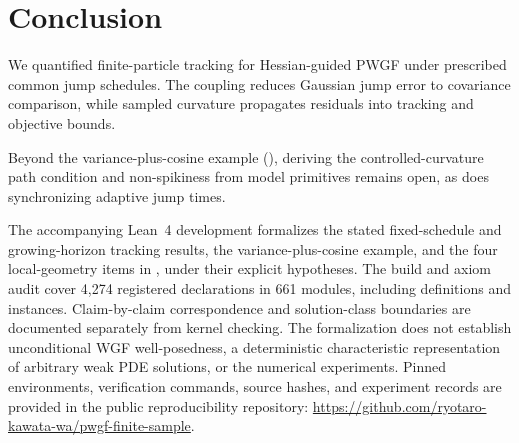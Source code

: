 \section{Conclusion}
\label{sec:conclusion}

We quantified finite-particle tracking for Hessian-guided PWGF under prescribed
common jump schedules. The coupling reduces Gaussian jump error to covariance
comparison, while sampled curvature propagates residuals into tracking and
objective bounds.

Beyond the variance-plus-cosine example
(), deriving the controlled-curvature
path condition and non-spikiness from model primitives remains open,
as does synchronizing adaptive jump times.

The accompanying Lean~4 development formalizes the stated fixed-schedule
and growing-horizon tracking results, the variance-plus-cosine example,
and the four local-geometry items in ,
under their explicit hypotheses. The build and axiom audit
cover 4,274 registered declarations in 661 modules, including definitions and instances.
Claim-by-claim correspondence and solution-class boundaries are documented
separately from kernel checking. The formalization does not establish
unconditional WGF well-posedness, a deterministic characteristic representation
of arbitrary weak PDE solutions, or the numerical experiments.
Pinned environments, verification commands, source hashes, and experiment
records are provided in the public reproducibility repository:
\url{https://github.com/ryotaro-kawata-wa/pwgf-finite-sample}.
